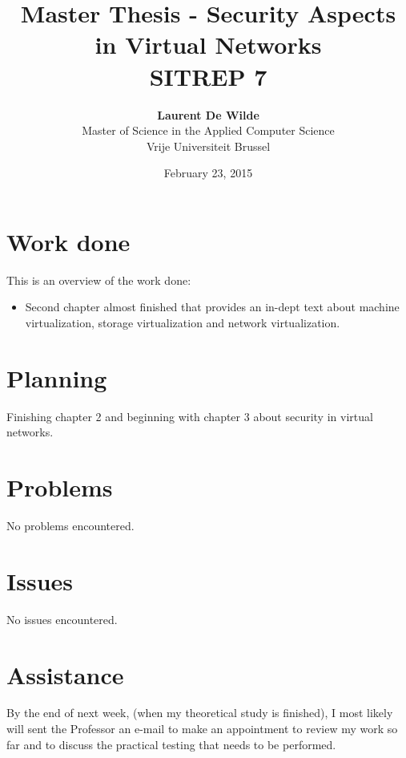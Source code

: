 \documentclass[11pt, a4paper]{article}
\title{Master Thesis -  Security Aspects in Virtual Networks\\ \textbf{SITREP 7}}
\author{\textbf{Laurent De Wilde} \\ Master of Science in the Applied Computer Science \\ Vrije Universiteit Brussel}
\date{February 23, 2015}
\begin{document}
\maketitle

\section{Work done}

This is an overview of the work done:
\begin{itemize}
\item Second chapter almost finished that provides an in-dept text about machine virtualization, storage virtualization and network virtualization.
\end{itemize}

\section{Planning}

Finishing chapter 2 and beginning with chapter 3 about security in virtual networks.

\section{Problems}

No problems encountered.

\section{Issues}

No issues encountered.

\section{Assistance}

By the end of next week, (when my theoretical study is finished), I most likely will sent the Professor an e-mail to make an appointment to review my work so far and to discuss the practical testing that needs to be performed.
\end{document}
